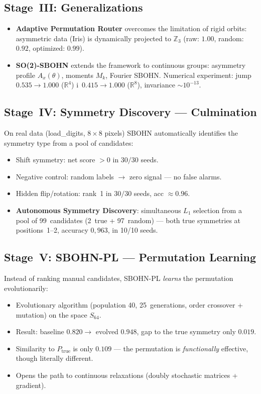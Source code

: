 \documentclass[11pt,a4paper]{report}
\begin{document}
\subsection{Stage~III: Generalizations}

\begin{itemize}
\item \textbf{Adaptive Permutation Router} overcomes the limitation of rigid orbits: asymmetric data (Iris) is dynamically projected to $\mathbb{Z}_3$ (raw: $1.00$, random: $0.92$, optimized: $0.99$).
\item \textbf{SO(2)-SBOHN} extends the framework to continuous groups: asymmetry profile $A_x(\theta)$, moments $M_k$, Fourier SBOHN. Numerical experiment: jump $0.535\to 1.000$ ($\mathbb{R}^4$) i~$0.415\to 1.000$ ($\mathbb{R}^8$), invariance ${\sim}10^{-13}$.
\end{itemize}

\subsection{Stage~IV: Symmetry Discovery --- Culmination}

On real data (load\_digits, $8{\times}8$ pixels) SBOHN automatically identifies the symmetry type from a pool of candidates:
\begin{itemize}
\item Shift symmetry: net score $> 0$ in $30/30$ seeds.
\item Negative control: random labels $\to$ zero signal --- no false alarms.
\item Hidden flip/rotation: rank~1 in $30/30$ seeds, acc $\approx 0.96$.
\item \textbf{Autonomous Symmetry Discovery}: simultaneous $L_1$ selection from a pool of 99~candidates (2~true + 97~random) --- both true symmetries at positions~1--2, accuracy $0{,}963$, in 10/10 seeds.
\end{itemize}

\subsection{Stage~V: SBOHN-PL --- Permutation Learning}

Instead of ranking manual candidates, SBOHN-PL \emph{learns} the permutation evolutionarily:
\begin{itemize}
\item Evolutionary algorithm (population 40, 25~generations, order crossover + mutation) on the space $S_{64}$.
\item Result: baseline $0.820 \to$ evolved $0.948$, gap to the true symmetry only $0.019$.
\item Similarity to $P_{\mathrm{true}}$ is only $0.109$ --- the permutation is \emph{functionally} effective, though literally different.
\item Opens the path to continuous relaxations (doubly stochastic matrices + gradient).
\end{itemize}
\end{document}
